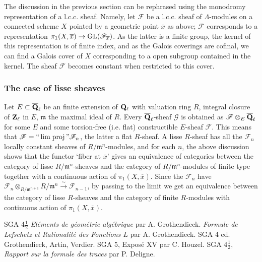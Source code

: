 \documentclass[deligne.tex]{subfiles}
\begin{document}
The discussion in the previous section can be rephrased using the
monodromy representation of a l.c.c. sheaf. Namely, let $\mathscr F$
be a l.c.c. sheaf of $\Lambda$-modules on a connected scheme $X$ pointed
by a geometric point $\overline x$ as above; $\mathscr F$ corresponds
to a representation $\pi_1(X,\overline x)\rightarrow\operatorname{GL}(\mathscr F_{\overline x})$.
As the latter is a finite group, the kernel of this representation is of
finite index, and as the Galois coverings are cofinal, we can find a Galois
cover of $X$ corresponding to a open subgroup contained in the kernel.
The sheaf $\mathscr F$ becomes constant when restricted to this cover.

\subsubsection*{The case of lisse sheaves} Let $E\subset\overline{\mathbf{Q}}_\ell$
be an finite extension of $\mathbf{Q}_\ell$ with valuation ring $R$, integral
closure of $\mathbf{Z}_\ell$ in $E$, $\mathfrak m$ the maximal ideal of $R$.
Every $\overline{\mathbf{Q}}_\ell$-sheaf $\mathscr G$ is obtained as
$\mathscr F\otimes_E\overline{\mathbf{Q}}_\ell$ for some $E$ and some torsion-free 
(i.e. flat) constructible $E$-sheaf $\mathscr F$. This means that
$\mathscr F=``\operatorname{lim\;proj}"\mathscr F_n$, the latter a flat
$R$-sheaf. A lisse $R$-sheaf has all the $\mathscr F_n$ locally constant
sheaves of $R/\mathfrak m^n$-modules, and for each $n$, the above discussion
shows that the functor `fiber at $\overline x$' gives an equivalence of
categories between the category of lisse $R/\mathfrak m^n$-sheaves and the
category of $R/\mathfrak m^n$-modules of finite type together with a
continuous action of $\pi_1(X,\overline x)$. Since the $\mathscr F_n$ have
$\mathscr F_n\otimes_{R/\mathfrak m^{n+1}}R/\mathfrak m^n\xrightarrow{\sim}\mathscr F_{n-1}$, by passing to the limit we get an equivalence between
the category of lisse $R$-sheaves and the category of finite $R$-modules
with continuous action of $\pi_1(X,\overline x)$.

\begin{thebibliography}{SGA 4$\tfrac12$}
 \textit{Eléments de géométrie algébrique} par A. Grothendieck.
 \textit{Formule de Lefschetz et Rationalité des Fonctions
$L$} par A. Grothendieck.
 SGA 4 ed. Grothendieck, Artin, Verdier.
 SGA 5, Exposé XV par C. Houzel.
SGA 4$\frac{1}{2}$, \textit{Rapport sur la formule des traces} par P. Deligne.
\end{thebibliography}
\end{document}
